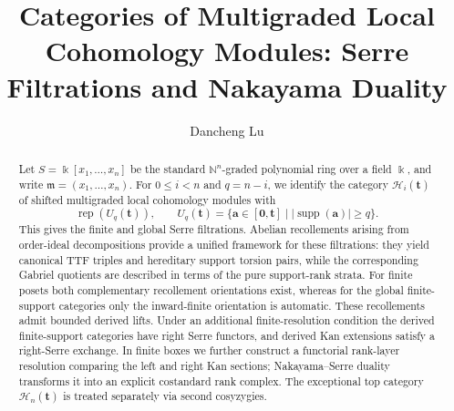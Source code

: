 \documentclass[12pt,reqno]{amsart}
\theoremstyle{definition}
\theoremstyle{remark}
\newcommand{\Rep}{\operatorname{rep}}
\begin{document}
\title{Categories of Multigraded Local Cohomology Modules: Serre Filtrations and Nakayama Duality}
\author{Dancheng Lu}
\address{School of Mathematical Sciences, Soochow University, Suzhou 215006, P.~R.~China}

\begin{abstract}
Let $S=\Bbbk[x_1,\ldots,x_n]$ be the standard $\mathbb N^n$-graded
polynomial ring over a field $\Bbbk$, and write $\mathfrak m=(x_1,\ldots,x_n)$.  For
$0\le i<n$ and $q=n-i$, we identify the category
$\mathcal H_i(\mathbf t)$ of shifted multigraded local cohomology modules with
\[
\Rep(U_q(\mathbf t)),\qquad
U_q(\mathbf t)=\{\mathbf a\in[\mathbf0,\mathbf t]\mid
|\operatorname{supp}(\mathbf a)|\ge q\}.
\]
This gives the finite and global Serre filtrations.  Abelian recollements
arising from order-ideal decompositions provide a unified framework for these
filtrations: they yield canonical TTF triples and hereditary support torsion
pairs, while the corresponding Gabriel quotients are described in terms of
the pure support-rank strata.  For
finite posets both complementary recollement orientations
exist, whereas for the global finite-support categories only the
inward-finite orientation is automatic.  These recollements admit bounded
derived lifts.  Under an additional finite-resolution condition the derived
finite-support categories have right Serre functors, and derived Kan
extensions satisfy a right-Serre exchange.  In finite boxes we further
construct a functorial rank-layer resolution comparing the left and right Kan
sections; Nakayama--Serre duality transforms it into an explicit costandard
rank complex.  The exceptional top category $\mathcal H_n(\mathbf t)$ is
treated separately via second cosyzygies.
\end{abstract}


\maketitle
\end{document}
